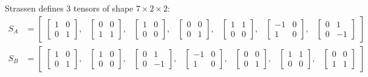 Strassen defines 3 tensors of shape $7\times 2\times 2$:
\begin{align*}
S_A &= \begin{bmatrix}
\begin{bmatrix}1 & 0\\0 & 1\end{bmatrix}, &
\begin{bmatrix}0 & 0\\1 & 1\end{bmatrix}, &
\begin{bmatrix}1 & 0\\0 & 0\end{bmatrix}, &
\begin{bmatrix}0 & 0\\0 & 1\end{bmatrix}, &
\begin{bmatrix}1 & 1\\0 & 0\end{bmatrix}, &
\begin{bmatrix}-1 & 0\\1 & 0\end{bmatrix}, &
\begin{bmatrix}0 & 1\\0 & -1\end{bmatrix}
\end{bmatrix}
\\
S_B &= \begin{bmatrix}
\begin{bmatrix}1 & 0\\0 & 1\end{bmatrix}, &
\begin{bmatrix}1 & 0\\0 & 0\end{bmatrix}, &
\begin{bmatrix}0 & 1\\0 & -1\end{bmatrix}, &
\begin{bmatrix}-1 & 0\\1 & 0\end{bmatrix}, &
\begin{bmatrix}0 & 0\\0 & 1\end{bmatrix}, &
\begin{bmatrix}1 & 1\\0 & 0\end{bmatrix}, &
\begin{bmatrix}0 & 0\\1 & 1\end{bmatrix}

\end{bmatrix}
\end{align*}
